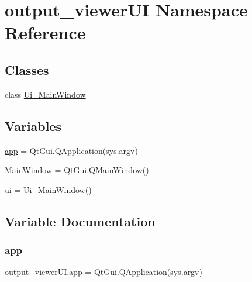 \hypertarget{namespaceoutput__viewer_u_i}{}\section{output\+\_\+viewer\+UI Namespace Reference}
\label{namespaceoutput__viewer_u_i}
\subsection*{Classes}
\begin{DoxyCompactItemize}
\item 
class \hyperlink{classoutput__viewer_u_i_1_1_ui___main_window}{Ui\+\_\+\+Main\+Window}
\end{DoxyCompactItemize}
\subsection*{Variables}
\begin{DoxyCompactItemize}
\item 
\hyperlink{namespaceoutput__viewer_u_i_a2c3ab398f8123bd6d034a961fc6a4368}{app} = Qt\+Gui.\+Q\+Application(sys.\+argv)
\item 
\hyperlink{namespaceoutput__viewer_u_i_a95763e93bffcc3d9bda7ae977c5c2c4e}{Main\+Window} = Qt\+Gui.\+Q\+Main\+Window()
\item 
\hyperlink{namespaceoutput__viewer_u_i_a86154c987d338cba4f5269407ad97f69}{ui} = \hyperlink{classoutput__viewer_u_i_1_1_ui___main_window}{Ui\+\_\+\+Main\+Window}()
\end{DoxyCompactItemize}


\subsection{Variable Documentation}
\hypertarget{namespaceoutput__viewer_u_i_a2c3ab398f8123bd6d034a961fc6a4368}{}\label{namespaceoutput__viewer_u_i_a2c3ab398f8123bd6d034a961fc6a4368} 
\subsubsection{\texorpdfstring{app}{app}}
{\footnotesize\ttfamily output\+\_\+viewer\+U\+I.\+app = Qt\+Gui.\+Q\+Application(sys.\+argv)}

\hypertarget{namespaceoutput__viewer_u_i_a95763e93bffcc3d9bda7ae977c5c2c4e}{}\label{namespaceoutput__viewer_u_i_a95763e93bffcc3d9bda7ae977c5c2c4e} 
